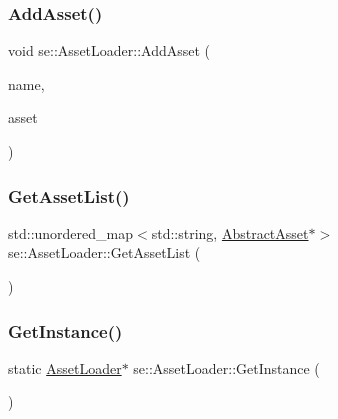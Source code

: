 \subsubsection{\texorpdfstring{Add\+Asset()}{AddAsset()}}
{\footnotesize\ttfamily void se\+::\+Asset\+Loader\+::\+Add\+Asset (\begin{DoxyParamCaption}\item[{const std\+::string \&}]{name,  }\item[{\mbox{\hyperlink{classse_1_1_abstract_asset}{Abstract\+Asset}} $\ast$}]{asset }\end{DoxyParamCaption})}

\mbox{\label{classse_1_1_asset_loader_af6cb24e98780a9e9196b051044de41d8}} 
\subsubsection{\texorpdfstring{Get\+Asset\+List()}{GetAssetList()}}
{\footnotesize\ttfamily std\+::unordered\+\_\+map$<$std\+::string, \mbox{\hyperlink{classse_1_1_abstract_asset}{Abstract\+Asset}}$\ast$$>$ se\+::\+Asset\+Loader\+::\+Get\+Asset\+List (\begin{DoxyParamCaption}{ }\end{DoxyParamCaption})}

\mbox{\label{classse_1_1_asset_loader_adb388965562391024b67dba4c2da2b9a}} 
\subsubsection{\texorpdfstring{Get\+Instance()}{GetInstance()}}
{\footnotesize\ttfamily static \mbox{\hyperlink{classse_1_1_asset_loader}{Asset\+Loader}}$\ast$ se\+::\+Asset\+Loader\+::\+Get\+Instance (\begin{DoxyParamCaption}{ }\end{DoxyParamCaption})\hspace{0.3cm}{\ttfamily [static]}}

\mbox{\label{classse_1_1_asset_loader_a2a026ba0e30f88b0c710ca719e9f6af0}} 
